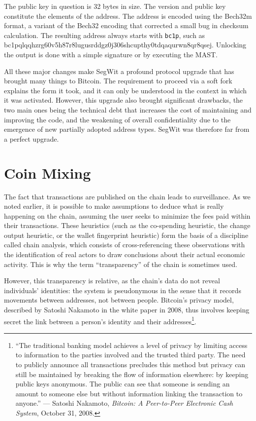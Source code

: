 \documentclass[
  a5paper,
  smalldemyvopaper,10pt,twoside,onecolumn,openright,extrafontsizes,hidelinks]{memoir}
\begin{document}
The public key in question is 32 bytes in size. The version and public
key constitute the elements of the address. The address is encoded using
the Bech32m format, a variant of the Bech32 encoding that corrected a
small bug in checksum calculation. The resulting address always starts
with \texttt{bc1p}, such as
bc1pqlqqhzrg60v5h87r8lugusrddgz0j306shcupthy0tdqaqurwn8qr8qsej.
Unlocking the output is done with a simple signature or by executing the
MAST.

All these major changes make SegWit a profound protocol upgrade that has
brought many things to Bitcoin. The requirement to proceed via a soft
fork explains the form it took, and it can only be understood in the
context in which it was activated. However, this upgrade also brought
significant drawbacks, the two main ones being the technical debt that
increases the cost of maintaining and improving the code, and the
weakening of overall confidentiality due to the emergence of new
partially adopted address types. SegWit was therefore far from a perfect
upgrade.

\section*{Coin Mixing}\label{coin-mixing}


The fact that transactions are published on the chain leads to
surveillance. As we noted earlier, it is possible to make assumptions to
deduce what is really happening on the chain, assuming the user seeks to
minimize the fees paid within their transactions. These heuristics (such
as the co-spending heuristic, the change output heuristic, or the wallet
fingerprint heuristic) form the basis of a discipline called chain
analysis, which consists of cross-referencing these observations with
the identification of real actors to draw conclusions about their actual
economic activity. This is why the term ``transparency'' of the chain is
sometimes used.

However, this transparency is relative, as the chain's data do not
reveal individuals' identities: the system is pseudonymous in the sense
that it records movements between addresses, not between people.
Bitcoin's privacy model, described by Satoshi Nakamoto in the white
paper in 2008, thus involves keeping secret the link between a person's
identity and their addresses\footnote{``The traditional banking model
  achieves a level of privacy by limiting access to information to the
  parties involved and the trusted third party. The need to publicly
  announce all transactions precludes this method but privacy can still
  be maintained by breaking the flow of information elsewhere: by
  keeping public keys anonymous. The public can see that someone is
  sending an amount to someone else but without information linking the
  transaction to anyone.'' --- Satoshi Nakamoto, \emph{Bitcoin: A
  Peer-to-Peer Electronic Cash System}, October 31, 2008.}.
\end{document}
